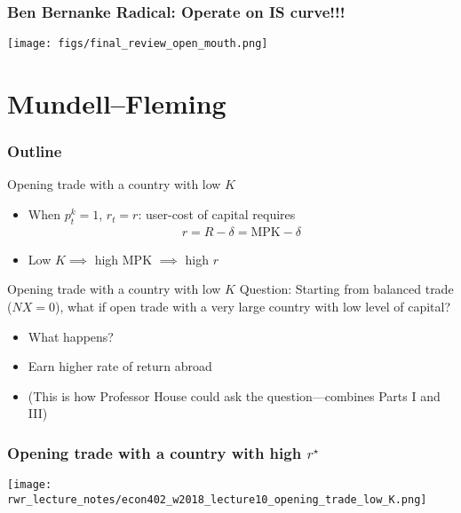 \documentclass[presentation,dvipsnames]{beamer}
\begin{document}
\begin{frame}
\frametitle{Ben Bernanke Radical: Operate on IS curve!!!}
\centerline{\texttt{[image: figs/final\_review\_open\_mouth.png]}}
\end{frame}

\section{Mundell--Fleming}
\label{sec-6}

\begin{frame}
\frametitle{Outline}
\tableofcontents[currentsection]
\end{frame}

\begin{frame}[label=sec-6-1]{Opening trade with a country with low $K$}
\begin{itemize}[label={--}]
\item When $p^{k}_{t} = 1$, $r_{t} = r$: user-cost of capital requires
\begin{align*}
r = R - \delta = \text{MPK} - \delta
\end{align*}
\item Low $K \implies$ high $\text{MPK}$ $\implies$ high $r$
\end{itemize}
\end{frame}

\begin{frame}[label=sec-6-1]{Opening trade with a country with low $K$}
Question: \textcolor{RubineRed}{Starting from balanced trade ($NX = 0$),
what if open trade with a very large country with low level of capital?}
\begin{itemize}[label={--}]
\item What happens?
\item Earn higher rate of return abroad
\item (This is how Professor House could ask the question---combines Parts I and III)
\end{itemize}
\end{frame}

\begin{frame}
\frametitle{Opening trade with a country with high $r^{\star}$}
\centerline{\texttt{[image: rwr\_lecture\_notes/econ402\_w2018\_lecture10\_opening\_trade\_low\_K.png]}}
\end{frame}
\end{document}
